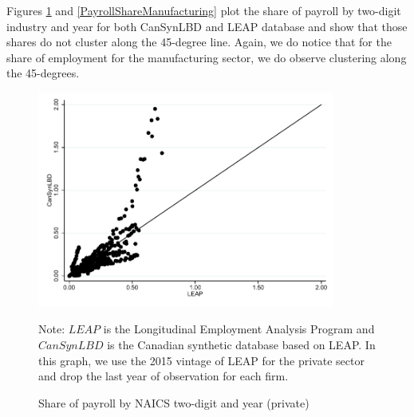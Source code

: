 \documentclass{article}
\begin{document}
Figures \ref{PayrollSharePrivate} and \ref{PayrollShareManufacturing} plot the share of payroll by two-digit industry and year for both CanSynLBD and LEAP database and show that those shares do not cluster along the 45-degree line. Again, we do notice that for the share of employment for the manufacturing sector, we do observe clustering along the 45-degrees.
\begin{figure} [H]
\centering
\caption{Share of payroll by NAICS two-digit and year (private)} \label{PayrollSharePrivate}
\includegraphics[height=2.8in, width=.7\linewidth]{graphs/Share_of_payroll_by_NAICS_two-digit_and_year_private_bw.pdf} 
\begin{minipage}{0.85\textwidth}
{\footnotesize Note: $LEAP$ is the Longitudinal Employment Analysis Program and $CanSynLBD$ is the Canadian synthetic database based on LEAP. In this graph, we use the 2015 vintage of LEAP for the private sector and drop the last year of observation for each firm. \par}
\end{minipage}
\end{figure}
\vspace{-15.5pt}
\end{document}
